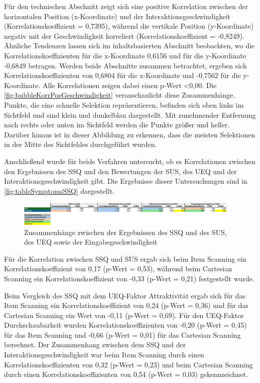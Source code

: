 Für den technischen Abschnitt zeigt sich eine positive Korrelation zwischen der horizontalen Position (x-Koordinate) und der Interaktionsgeschwindigkeit (Korrelationskoeffizient = 0,7395), während die vertikale Position (y-Koordinate) negativ mit der Geschwindigkeit korreliert (Korrelationskoeffizient = -0,8249). Ähnliche Tendenzen lassen sich im inhaltsbasierten Abschnitt beobachten, wo die Korrelationskoeffizienten für die x-Koordinate 0,6156 und für die y-Koordinate -0,6849 betragen. Werden beide Abschnitte zusammen betrachtet, ergeben sich Korrelationskoeffizienten von 0,6804 für die x-Koordinate und -0,7562 für die y-Koordinate. Alle Korrelationen zeigen dabei einen p-Wert <0,00. Die \autoref{fig:bubbleKorrPosGeschwindigkeit} veranschaulicht diese Zusammenhänge. Punkte, die eine schnelle Selektion repräsentieren, befinden sich oben links im Sichtfeld und sind klein und dunkelblau dargestellt. Mit zunehmender Entfernung nach rechts oder unten im Sichtfeld werden die Punkte größer und heller. Darüber hinaus ist in dieser Abbildung zu erkennen, dass die meisten Selektionen in der Mitte des Sichtfeldes durchgeführt wurden.

Anschließend wurde für beide Verfahren untersucht, ob es Korrelationen zwischen den Ergebnissen des SSQ und den Bewertungen der SUS, des UEQ und der Interaktionsgeschwindigkeit gibt. Die Ergebnisse dieser Untersuchungen sind in \autoref{fig:tableSymptomsSSQ} dargestellt.

\begin{figure}[tbh]
    \centering
    \includegraphics[width=0.95\textwidth]{images/Results/Korrelationen-SSQ.png}
    \caption{Zusammenhänge zwischen der Ergebnissen des SSQ und des SUS, des UEQ sowie der Eingabegeschwindigkeit}
    \label{fig:TableKorrelationenSSQ}
\end{figure}

Für die Korrelation zwischen SSQ und SUS ergab sich beim Item Scanning ein Korrelationskoeffizient von 0,17 (p-Wert = 0,53), während beim Cartesian Scanning ein Korrelationskoeffizient von -0,33 (p-Wert = 0,21) festgestellt wurde. 

Beim Vergleich des SSQ mit dem UEQ-Faktor Attraktivität ergab sich für das Item Scanning ein Korrelationskoeffizient von 0,24 (p-Wert = 0,36) und für das Cartesian Scanning ein Wert von -0,11 (p-Wert = 0,69). Für den UEQ-Faktor Durchschaubarkeit wurden Korrelationskoeffizienten von -0,20 (p-Wert = 0,45) für das Item Scanning und -0,66 (p-Wert = 0,01) für das Cartesian Scanning berechnet. Der Zusammenhang zwischen dem SSQ und der Interaktionsgeschwindigkeit war beim Item Scanning durch einen Korrelationskoeffizienten von 0,32 (p-Wert = 0,23) und beim Cartesian Scanning durch einen Korrelationskoeffizienten von 0,54 (p-Wert = 0,03) gekennzeichnet.

